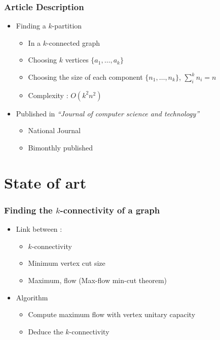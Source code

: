 \documentclass[xcolor=dvipsnames]{beamer}
\begin{document}
\begin{frame}
  \frametitle{Article Description}
  \begin{itemize}
  \item Finding a $k$-partition
    \begin{itemize}
    \item In a $k$-connected graph
    \item Choosing $k$ vertices $\{a_1, \dots , a_k\}$
    \item Choosing the size of each component $\{n_1, \dots ,n_k\}$,
      $\sum\limits_{i}^k{n_i} = n$
    \item Complexity : $O(k^2 n^2)$
    \end{itemize}
  \item Published in {\em ``Journal of computer science and technology''}
    \begin{itemize}
    \item National Journal
    \item Bimonthly published
    \end{itemize}
  \end{itemize}
\end{frame}

\section{State of art}

\begin{frame}
  \frametitle{Finding the $k$-connectivity of a graph}
  \begin{itemize}
  \item  Link between :
    \begin{itemize}
    \item $k$-connectivity 
    \item Minimum vertex cut size
    \item Maximum, flow (Max-flow min-cut theorem)
    \end{itemize}

  \item Algorithm
    \begin{itemize}
    \item Compute maximum flow with vertex unitary capacity
    \item Deduce the $k$-connectivity
    \end{itemize}
  \end{itemize}

\end{frame}
\end{document}
